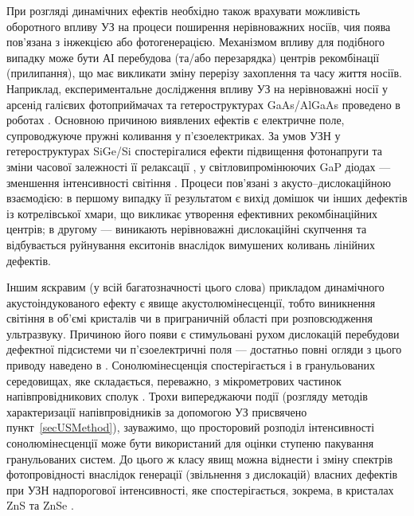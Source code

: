 При розгляді динамічних ефектів необхідно також врахувати можливість оборотного впливу УЗ на процеси поширення нерівноважних носіїв, чия поява пов'язана з інжекцією або фотогенерацією.
Механізмом впливу для подібного випадку може  бути АІ перебудова (та/або перезарядка)  центрів рекомбінації (прилипання), що має викликати зміну перерізу захоплення та часу життя носіїв.
Наприклад, експериментальне дослідження впливу УЗ на нерівноважні носії у арсенід галієвих фотоприймачах та гетероструктурах GaAs/AlGaAs проведено в роботах \cite{Zaveryukhin2002:2,Olikh:Visn2007}.
Основною причиною виявлених ефектів є електричне поле, супроводжуюче пружні коливання у п'єзоелектриках.
За умов УЗН у гетероструктурах SiGe/Si спостерігалися ефекти підвищення фотонапруги та зміни часової залежності її релаксації  \cite{Ostrovskii2001,Kuryliuk2009},
у світловипромінюючих GaP  діодах  --- зменшення інтенсивності світіння \cite{USL:GaP}.
Процеси пов'язані з акусто--дислокаційною взаємодією:
в першому випадку її результатом є вихід домішок чи інших дефектів із котрелівської хмари, що викликає утворення ефективних рекомбінаційних центрів;
в другому --- виникають нерівноважні дислокаційні скупчення та відбувається руйнування екситонів внаслідок вимушених коливань лінійних дефектів.

Іншим яскравим (у всій багатозначності цього слова) прикладом
динамічного акустоіндукованого ефекту
є явище акустолюмінесценції, тобто виникнення світіння в об'ємі  кристалів чи в приграничній області при розповсюдження ультразвуку.
Причиною його появи є стимульовані рухом дислокацій перебудови дефектної підсистеми чи п'єзоелектричні поля ---
достатньо повні огляди з цього приводу наведено в \cite{OstrBook,OSTROVSKII1999}.
Сонолюмінесценція спостерігається і в гранульованих середовищах, яке складається, переважно, з мікрометрових частинок напівпровідникових сполук \cite{KorotRep}.
Трохи випереджаючи події (розгляду методів характеризації напівпровідників за допомогою УЗ присвячено пункт~\ref{secUSMethod}),
зауважимо, що просторовий розподіл інтенсивності сонолюмінесценції може бути використаний для оцінки ступеню пакування гранульованих систем\cite{KorotZnSdens}.
До цього ж класу явищ можна віднести і зміну спектрів фотопровідності внаслідок генерації (звільнення з дислокацій) власних дефектів при УЗН надпорогової інтенсивності, яке спостерігається, зокрема, в кристалах ZnS та ZnSe \cite{OSTROVSKII1992,OSTROVSKII1999}.

